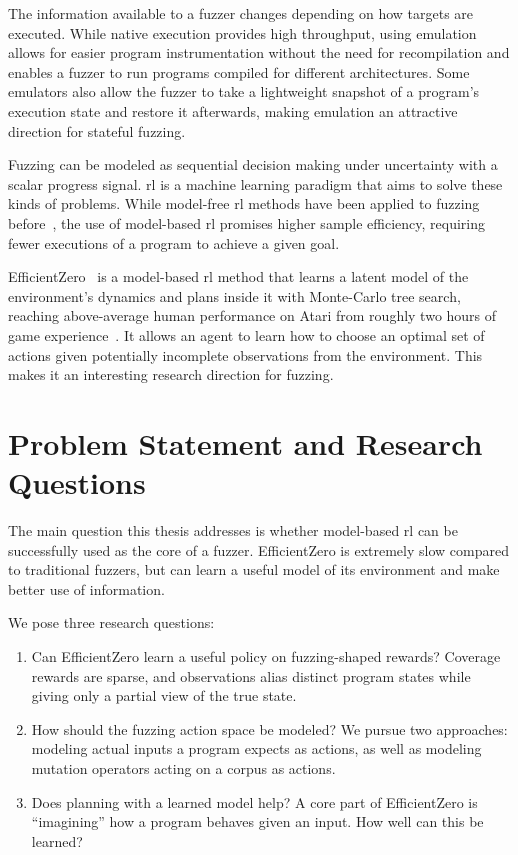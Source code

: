 The information available to a fuzzer changes depending on how targets are executed.
While native execution provides high throughput, using emulation allows for easier
program instrumentation without the need for recompilation and enables a fuzzer to
run programs compiled for different architectures.
Some emulators also allow the fuzzer to take a lightweight snapshot of a program's
execution state and restore it afterwards, making emulation an attractive direction
for stateful fuzzing.

Fuzzing can be modeled as sequential decision making under uncertainty with a scalar progress signal.
\Gls{rl} is a machine learning paradigm that aims to solve these
kinds of problems.
While model-free \gls{rl} methods have been applied to fuzzing before~\cite{bottinger_deep_2018,binosi_rainfuzz_2023,wang_reinforcement_2021,wang_syzvegas_2021,borcherding_bandits_2023},
the use of model-based \gls{rl} promises higher sample efficiency, requiring fewer
executions of a program to achieve a given goal.

EfficientZero~\cite{ye_mastering_2021} is a model-based \gls{rl} method that learns a
latent model of the environment's dynamics and plans inside it with Monte-Carlo
tree search, reaching above-average human performance on Atari from roughly two
hours of game experience~\cite{kaiser_model-based_2024}.
It allows an agent to learn how to choose an optimal set of actions given
potentially incomplete observations from the environment.
This makes it an interesting research direction for fuzzing.

\section{Problem Statement and Research Questions}\label{sec:introduction-rqs}

The main question this thesis addresses is whether model-based \gls{rl} can be
successfully used as the core of a fuzzer. EfficientZero is extremely slow
compared to traditional fuzzers, but can learn a useful model of its
environment and make better use of information.

We pose three research questions:

\begin{enumerate}[label=\textbf{RQ\arabic*.}, ref=RQ\arabic*, leftmargin=*]
  \item\label{rq:learnability}
    Can EfficientZero learn a useful policy on fuzzing-shaped rewards?
    Coverage rewards are sparse, and observations alias distinct program states
    while giving only a partial view of the true state.

  \item\label{rq:action-space}
    How should the fuzzing action space be modeled?
    We pursue two approaches: modeling actual inputs a program expects as actions,
    as well as modeling mutation operators acting on a corpus as actions.

  \item\label{rq:planning}
    Does planning with a learned model help? A core part of EfficientZero is
    \enquote{imagining} how a program behaves given an input. How well can this be learned?
\end{enumerate}

